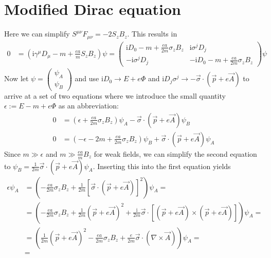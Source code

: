\documentclass[english, parskip=full]{scrartcl}
\newcommand{\kla}{}
\newcommand{\klam}{}
\def\I{\text{i}}
\begin{document}
\section{Modified Dirac equation}
Here we can simplify $S^{\mu\nu}F_{\mu\nu}=-2S_zB_z$. This results in 
\begin{align*}
0&=\kla\left( {\I\gamma^\mu D_\mu-m+\frac{ea}{m}S_zB_z} \right)\psi=\begin{pmatrix}
\I D_0-m+\frac{ea}{2m}\sigma_zB_z& \I\sigma^jD_j\\
-\I\sigma^jD_j & -\I D_0-m+\frac{ea}{2m}\sigma_zB_z
\end{pmatrix}\psi
\end{align*}
Now let $\psi=\begin{pmatrix}
\psi_A \\ \psi_B
\end{pmatrix} $ and use $\I D_0\rightarrow E+e\Phi$ and $\I D_j\sigma^j\rightarrow -\vec{\sigma}\cdot (\vec{p}+e\vec{A})$ to arrive at a set of two equations where we introduce the small quantity $\epsilon:=E-m+e\Phi$ as an abbreviation:
\begin{align*}
0&=\kla\left( {\epsilon+\frac{ea}{2m}\sigma_z B_z} \right)\psi_A-\vec{\sigma}\cdot\kla\left( {\vec{p}+e\vec{A}} \right)\psi_B\\
0&=\kla\left( {-\epsilon-2m+\frac{ea}{2m}\sigma_zB_z} \right)\psi_B+\vec{\sigma}\cdot\kla\left( {\vec{p}+e\vec{A}} \right)\psi_A
\end{align*}
Since $m\gg \epsilon$ and $m\gg \frac{ea}{m}B_z$ for weak fields, we can simplify the second equation to $\psi_B=\frac{1}{2m}\vec{\sigma}\cdot\kla\left( {\vec{p}+e\vec{A}} \right)\psi_A$. Inserting this into the first equation yields
\begin{align*}
\epsilon\psi_A&=\kla\left( {-\frac{ea}{2m}\sigma_z B_z+\frac{1}{2m}\klam\left[ {\vec{\sigma}\cdot\kla\left( {\vec{p}+e\vec{A}} \right)} \right]^2} \right)\psi_A=\\
&=\kla\left( {-\frac{ea}{2m}\sigma_z B_z+\frac{1}{2m}\kla\left( {\vec{p}+e\vec{A}} \right)^2+\frac{\I}{2m}\vec{\sigma}\cdot\klam\left[ {\kla\left( {\vec{p}+e\vec{A}} \right)\times\kla\left( {\vec{p}+e\vec{A}} \right)} \right]} \right)\psi_A=\\
&=\kla\left( {\frac{1}{2m}\kla\left( {\vec{p}+e\vec{A}} \right)^2-\frac{ea}{2m}\sigma_z B_z+\frac{e}{2m}\vec{\sigma}\cdot\kla\left( {\nabla\times\vec{A}} \right)} \right)\psi_A=\\
&=
\end{align*}
\end{document}
